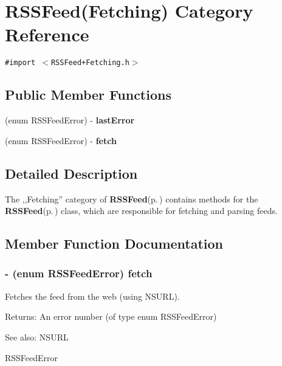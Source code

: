 \section{RSSFeed(Fetching) Category Reference}
\label{categoryRSSFeed(Fetching)}
{\tt \#import $<$RSSFeed+Fetching.h$>$}

\subsection*{Public Member Functions}
\begin{CompactItemize}
\item 
(enum RSSFeed\-Error) - {\bf last\-Error}
\item 
(enum RSSFeed\-Error) - {\bf fetch}
\end{CompactItemize}


\subsection{Detailed Description}
The ,,Fetching'' category of {\bf RSSFeed}{\rm (p.\,\pageref{classRSSFeed})} contains methods for the {\bf RSSFeed}{\rm (p.\,\pageref{classRSSFeed})} class, which are responsible for fetching and parsing feeds. 



\subsection{Member Function Documentation}
\subsubsection{\setlength{\rightskip}{0pt plus 5cm}- (enum RSSFeed\-Error) fetch }\label{categoryRSSFeed(Fetching)_34234d6ccb4ece076ae6ec3d86fb7f46}


Fetches the feed from the web (using NSURL).

\begin{Desc}
\item[Returns:]An error number (of type enum RSSFeed\-Error) \end{Desc}
\begin{Desc}
\item[See also:]NSURL 

RSSFeed\-Error \end{Desc}
